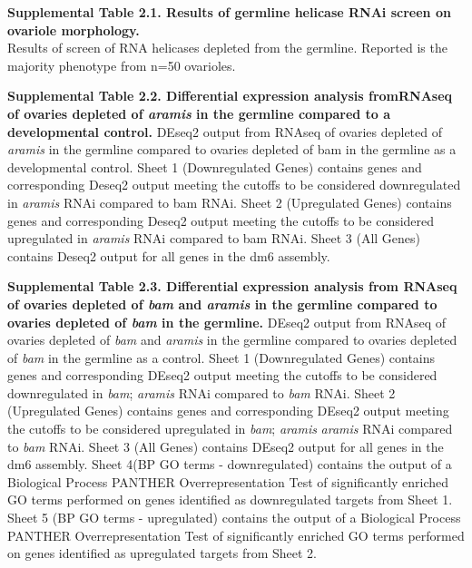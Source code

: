 \documentclass[12pt,oneside]{reedthesis}
\begin{document}
\textbf{\hfill\break
}

\textbf{Supplemental Table 2.1. Results of germline helicase RNAi screen on ovariole morphology.}\\
Results of screen of RNA helicases depleted from the germline. Reported
is the majority phenotype from n=50 ovarioles.

\textbf{\hfill\break
}

\textbf{Supplemental Table 2.2. Differential expression analysis fromRNAseq of ovaries depleted of \emph{aramis} in the germline compared to a developmental control.}
DEseq2 output from RNAseq of ovaries depleted
of \emph{aramis} in the germline compared to ovaries depleted of bam in the
germline as a developmental control. Sheet 1 (Downregulated Genes)
contains genes and corresponding Deseq2 output meeting the cutoffs to be
considered downregulated in \emph{aramis} RNAi compared to bam RNAi. Sheet 2
(Upregulated Genes) contains genes and corresponding Deseq2 output
meeting the cutoffs to be considered upregulated in \emph{aramis} RNAi
compared to bam RNAi. Sheet 3 (All Genes) contains Deseq2 output for all
genes in the dm6 assembly.

\textbf{Supplemental Table 2.3. Differential expression analysis from RNAseq of ovaries depleted of \emph{bam} and \emph{aramis} in the germline compared to ovaries depleted of \emph{bam} in the germline.}
DEseq2 output from RNAseq of ovaries depleted of \emph{bam} and \emph{aramis} in the germline compared to
ovaries depleted of \emph{bam} in the germline as a control. Sheet 1
(Downregulated Genes) contains genes and corresponding DEseq2 output
meeting the cutoffs to be considered downregulated in \emph{bam}; \emph{aramis}
RNAi compared to \emph{bam} RNAi. Sheet 2 (Upregulated Genes) contains genes
and corresponding DEseq2 output meeting the cutoffs to be considered
upregulated in \emph{bam}; \emph{aramis} \emph{aramis} RNAi compared to \emph{bam} RNAi.
Sheet 3 (All Genes) contains DEseq2 output for all genes in the dm6
assembly. Sheet 4(BP GO terms - downregulated) contains the output of a
Biological Process PANTHER Overrepresentation Test of significantly
enriched GO terms performed on genes identified as downregulated targets
from Sheet 1. Sheet 5 (BP GO terms - upregulated) contains the output of
a Biological Process PANTHER Overrepresentation Test of significantly
enriched GO terms performed on genes identified as upregulated targets
from Sheet 2.

\textbf{\hfill\break
}
\end{document}
